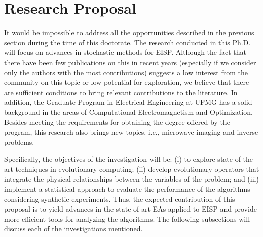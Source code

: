 	\section{Research Proposal}\label{chap:investigation:proposal}
	
		It would be impossible to address all the opportunities described in the previous section during the time of this doctorate. The research conducted in this Ph.D. will focus on advances in stochastic methods for EISP. Although the fact that there have been few publications on this in recent years (especially if we consider only the authors with the most contributions) suggests a low interest from the community on this topic or low potential for exploration, we believe that there are sufficient conditions to bring relevant contributions to the literature. In addition, the Graduate Program in Electrical Engineering at UFMG has a solid background in the areas of Computational Electromagnetism and Optimization. Besides meeting the requirements for obtaining the degree offered by the program, this research also brings new topics, i.e., microwave imaging and inverse problems.
		
		Specifically, the objectives of the investigation will be: (i) to explore state-of-the-art techniques in evolutionary computing; (ii) develop evolutionary operators that integrate the physical relationships between the variables of the problem; and (iii) implement a statistical approach to evaluate the performance of the algorithms considering synthetic experiments. Thus, the expected contribution of this proposal is to yield advances in the state-of-art EAs applied to EISP and provide more efficient tools for analyzing the algorithms. The following subsections will discuss each of the investigations mentioned.
		
